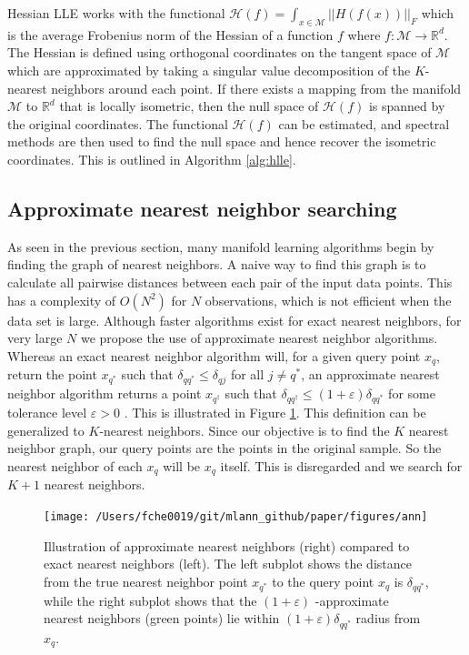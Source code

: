 \documentclass[11pt,a4paper,]{article}
\begin{document}
Hessian LLE \autocite[HLLE;][]{Donoho2003-am} works with the functional \(\mathcal{H}(f)=\int_{x\in\mathcal{M}}||H(f(x))||_F\) which is the average Frobenius norm of the Hessian of a function \(f\) where \(f:\mathcal{M}\rightarrow\mathbb{R}^d\). The Hessian is defined using orthogonal coordinates on the tangent space of \(\mathcal{M}\) which are approximated by taking a singular value decomposition of the \(K\)-nearest neighbors around each point. If there exists a mapping from the manifold \(\mathcal{M}\) to \(\mathbb{R}^d\) that is locally isometric, then the null space of \(\mathcal{H}(f)\) is spanned by the original coordinates. The functional \(\mathcal{H}(f)\) can be estimated, and spectral methods are then used to find the null space and hence recover the isometric coordinates. This is outlined in Algorithm \ref{alg:hlle}.

\hypertarget{ann}{%
\subsection{Approximate nearest neighbor searching}\label{ann}}

As seen in the previous section, many manifold learning algorithms begin by finding the graph of nearest neighbors. A naive way to find this graph is to calculate all pairwise distances between each pair of the input data points. This has a complexity of \(O(N^2)\) for \(N\) observations, which is not efficient when the data set is large. Although faster algorithms exist for exact nearest neighbors, for very large \(N\) we propose the use of approximate nearest neighbor algorithms. Whereas an exact nearest neighbor algorithm will, for a given query point \(x_q\), return the point \(x_{q^*}\) such that \(\delta_{q{q^*}} \leq \delta_{qj}\) for all \(j\neq q^*\), an approximate nearest neighbor algorithm returns a point \(x_{q^\dagger}\) such that \(\delta_{q{q^\dagger}} \leq (1+\varepsilon) \delta_{q{q^*}}\) for some tolerance level \(\varepsilon > 0\) \autocite{AryaSunil1998-nd}. This is illustrated in Figure \ref{fig:ann}. This definition can be generalized to \(K\)-nearest neighbors. Since our objective is to find the \(K\) nearest neighbor graph, our query points are the points in the original sample. So the nearest neighbor of each \(x_q\) will be \(x_q\) itself. This is disregarded and we search for \(K+1\) nearest neighbors.

\begin{figure}

{\centering \texttt{[image: /Users/fche0019/git/mlann\_github/paper/figures/ann]} 

}

\caption{Illustration of approximate nearest neighbors (right) compared to exact nearest neighbors (left). The left subplot shows the distance from the true nearest neighbor point $x_{q^*}$ to the query point $x_q$ is $\delta_{q{q^*}}$, while the right subplot shows that the $(1+\varepsilon)$ -approximate nearest neighbors (green points) lie within $(1+\varepsilon) \delta_{q{q^*}}$ radius from $x_q$. }\label{fig:ann}
\end{figure}
\end{document}
